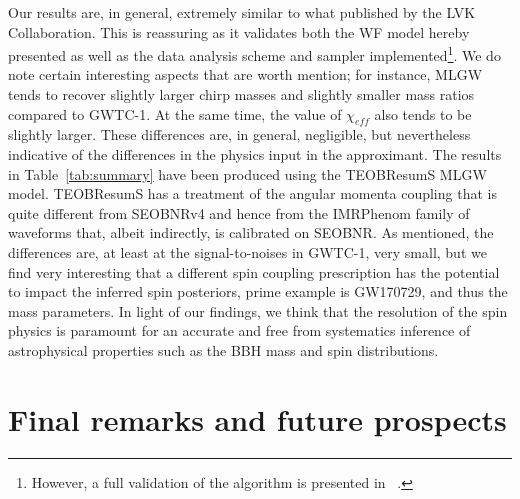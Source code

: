 Our results are, in general, extremely similar to what published by the LVK Collaboration. This is reassuring as it validates both the WF model hereby presented as well as the data analysis scheme and sampler implemented\footnote{However, a full validation of the algorithm is presented in ~\cite{}.}.
We do note certain interesting aspects that are worth mention; for instance, MLGW tends to recover slightly larger chirp masses and slightly 
smaller mass ratios compared to GWTC-1. At the same  time, the value of $\chi_{eff}$ also tends to be slightly larger. These differences are, in general, negligible, but nevertheless indicative of the differences in the physics input in the approximant. The results in Table~\ref{tab:summary} have been produced using the TEOBResumS MLGW model. TEOBResumS has a treatment of the angular momenta coupling that is quite different from SEOBNRv4 and hence from the IMRPhenom family of waveforms that, albeit indirectly, is calibrated on SEOBNR. As mentioned, the differences are, at least at the signal-to-noises in GWTC-1, very small, but we find very interesting that a different spin coupling prescription has the potential to impact the inferred spin posteriors, prime example is GW170729, and thus the mass parameters. 
In light of our findings, we think that the resolution of the spin physics is paramount for an accurate and free from systematics inference of astrophysical properties such as the BBH mass and spin distributions.

\section{Final remarks and future prospects}
\label{sec:end}


